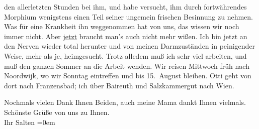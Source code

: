                den allerletzten Stunden bei ihm, und habe versucht, ihm durch fortwährendes Morphium
               wenigstens einen Teil seiner ungemein frischen Besinnung zu nehmen. Was für eine
               Krankheit ihn weggenommen hat von uns, das wissen wir noch immer nicht. Aber \uline{jetzt} braucht man’s auch nicht mehr wißen. Ich bin
               jetzt an den Nerven wieder total herunter und von meinen Darmzuständen in peinigender
               Weise, mehr als je, heimgesucht. Trotz alledem muß ich sehr viel arbeiten, und muß
               den ganzen Sommer an die Arbeit wenden. Wir reisen Mittwoch{ }früh nach Noordwijk, wo wir Sonntag eintreffen und bis 15. August bleiben. Otti geht von
               dort nach Franzensbad; ich über Baireuth und Salzkammergut
               nach Wien.\pend
           
\pstart
           Nochmals vielen Dank Ihnen Beiden, auch meine Mama dankt Ihnen vielmals. Schönste Grüße von uns zu Ihnen. {\\[\baselineskip]}Ihr
                  \spacefill\mbox{Salten}\pend
           \leftskip=0em{}\endnumbering{}  \newcommand{\dateiname}{L03497}\newcommand{\titel}{Felix Salten an Arthur Schnitzler, 5. 7. 1908}\newcommand{\editorInnen}{Martin Anton Müller und Laura Untner}
